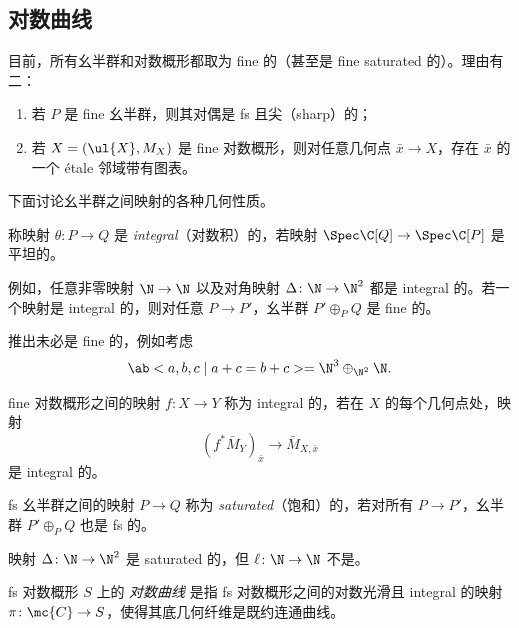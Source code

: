 \subsection{对数曲线}%
\label{sub:Log curves}

目前，所有幺半群和对数概形都取为 fine 的（甚至是 fine saturated 的）。理由有二：
\begin{enumerate}
    \item 若 \(P\) 是 fine 幺半群，则其对偶是 fs 且尖（sharp）的；
    \item 若 \(X = (\ul{X}, M_X)\) 是 fine 对数概形，则对任意几何点 \(\bar{x} \to X\)，存在 \(\bar{x}\) 的一个 \'etale 邻域带有图表。
\end{enumerate}

下面讨论幺半群之间映射的各种几何性质。
\begin{defn}
    称映射 \(\theta \colon P \to Q\) 是 \textit{integral}（对数积）的，若映射 \(\Spec\C[Q] \to \Spec \C[P]\) 是平坦的。
\end{defn}

例如，任意非零映射 \(\N \to \N\) 以及对角映射 \(\Delta \colon\N \to \N^2\) 都是 integral 的。若一个映射是 integral 的，则对任意 \(P \to P'\)，幺半群 \(P' \oplus_P Q\) 是 fine 的。

\begin{exm}
    推出未必是 fine 的，例如考虑
    \[ \ab< a ,b,c \mid a+c=b+c> = \N^3 \oplus_{\N^2} \N. \]
\end{exm}

\begin{defn}
    fine 对数概形之间的映射 \(f \colon X \to Y\) 称为 integral 的，若在 \(X\) 的每个几何点处，映射
    \[ (f^*\bar{M}_Y)_{\bar{x}} \to \bar{M}_{X,\bar{x}} \]
    是 integral 的。
\end{defn}

\begin{defn}
    fs 幺半群之间的映射 \(P \to Q\) 称为 \textit{saturated}（饱和）的，若对所有 \(P \to P'\)，幺半群 \(P' \oplus_P Q\) 也是 fs 的。
\end{defn}

\begin{exm}
    映射 \(\Delta \colon \N \to \N^2\) 是 saturated 的，但 \(\ell \colon \N \to \N\) 不是。
\end{exm}

\begin{defn}
    fs 对数概形 \(S\) 上的 \textit{对数曲线} 是指 fs 对数概形之间的对数光滑且 integral 的映射 \(\pi \colon \mc{C} \to S\)，使得其底几何纤维是既约连通曲线。
\end{defn}

